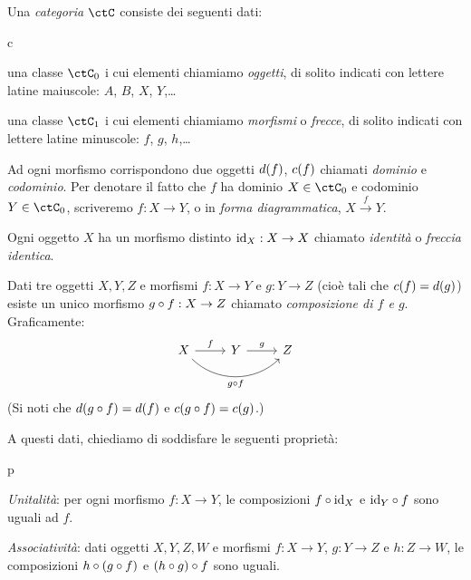 \begin{definition}[Categoria]\label{def_categ}
	Una \emph{categoria} \(\ctC\) consiste dei seguenti dati:
	\begin{enumtag}{c}
		\item\label{c_1} una classe \(\ctC_0\) i cui elementi chiamiamo \emph{oggetti}, di solito indicati con lettere latine maiuscole: \(A\), \(B\), \(X\), \(Y\),\dots
		\item\label{c_2} una classe \(\ctC_1\) i cui elementi chiamiamo \emph{morfismi} o \emph{frecce}, di solito indicati con lettere latine minuscole: \(f\), \(g\), \(h\),\dots
		\item\label{c_3} Ad ogni morfismo corrispondono due oggetti \(d(f)\), \(c(f)\) chiamati \emph{dominio} e \emph{codominio}. Per denotare il fatto che \(f\) ha dominio \(X\in\ctC_0\) e codominio \(Y\in\ctC_0\), scriveremo \(f:X\to Y\), o in \emph{forma diagrammatica}, \(X \xrightarrow{f} Y\).
		\item\label{c_4} Ogni oggetto \(X\) ha un morfismo distinto \(\mathrm{id}_X:X\to X\) chiamato \emph{identità} o \emph{freccia identica}.
		\item\label{c_5} Dati tre oggetti \(X,Y,Z\) e morfismi \(f:X\to Y\) e \(g:Y\to Z\) (cioè tali che \(c(f)=d(g)\)) esiste un unico morfismo \(g\circ f:X\to Z\) chiamato \emph{composizione di \(f\) e \(g\)}. Graficamente:
		\[
			\begin{tikzcd}
				X \ar{r}{f}
				\ar[rounded corners,out=-45, in=225]{rr}[swap]{g\cmp f}
				& Y \ar{r}{g} & Z \\
				&&
			\end{tikzcd}
		\]
		(Si noti che \(d(g\circ f)=d(f)\) e \(c(g\circ f)=c(g)\).)
	\end{enumtag}
	A questi dati, chiediamo di soddisfare le seguenti proprietà:
	\begin{enumtag}{p}
		\item \label{p_1} \emph{Unitalità}: per ogni morfismo \(f:X\to Y\), le composizioni \(f\circ\mathrm{id}_X\) e \(\mathrm{id}_Y\circ f\) sono uguali ad \(f\).
		\item \label{p_2} \emph{Associatività}: dati oggetti \(X,Y,Z,W\) e morfismi \(f:X\to Y\), \(g:Y\to Z\) e \(h:Z\to W\), le composizioni \(h\circ (g\circ f)\) e \((h\circ g)\circ f\) sono uguali.
	\end{enumtag}
\end{definition}
